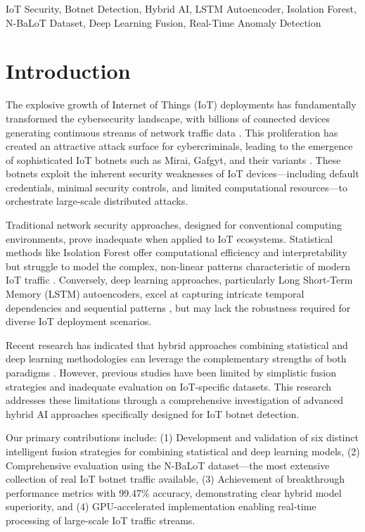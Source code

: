 \documentclass[conference]{IEEEtran}
\begin{document}
\begin{IEEEkeywords}
IoT Security, Botnet Detection, Hybrid AI, LSTM Autoencoder, Isolation Forest, N-BaLoT Dataset, Deep Learning Fusion, Real-Time Anomaly Detection
\end{IEEEkeywords}

\section{Introduction}
The explosive growth of Internet of Things (IoT) deployments has fundamentally transformed the cybersecurity landscape, with billions of connected devices generating continuous streams of network traffic data \cite{b6}. This proliferation has created an attractive attack surface for cybercriminals, leading to the emergence of sophisticated IoT botnets such as Mirai, Gafgyt, and their variants \cite{b15}. These botnets exploit the inherent security weaknesses of IoT devices—including default credentials, minimal security controls, and limited computational resources—to orchestrate large-scale distributed attacks.

Traditional network security approaches, designed for conventional computing environments, prove inadequate when applied to IoT ecosystems. Statistical methods like Isolation Forest offer computational efficiency and interpretability but struggle to model the complex, non-linear patterns characteristic of modern IoT traffic \cite{b16}. Conversely, deep learning approaches, particularly Long Short-Term Memory (LSTM) autoencoders, excel at capturing intricate temporal dependencies and sequential patterns \cite{b4}, but may lack the robustness required for diverse IoT deployment scenarios.

Recent research has indicated that hybrid approaches combining statistical and deep learning methodologies can leverage the complementary strengths of both paradigms \cite{b5}. However, previous studies have been limited by simplistic fusion strategies and inadequate evaluation on IoT-specific datasets. This research addresses these limitations through a comprehensive investigation of advanced hybrid AI approaches specifically designed for IoT botnet detection.

Our primary contributions include: (1) Development and validation of six distinct intelligent fusion strategies for combining statistical and deep learning models, (2) Comprehensive evaluation using the N-BaLoT dataset—the most extensive collection of real IoT botnet traffic available, (3) Achievement of breakthrough performance metrics with 99.47\% accuracy, demonstrating clear hybrid model superiority, and (4) GPU-accelerated implementation enabling real-time processing of large-scale IoT traffic streams.
\end{document}
